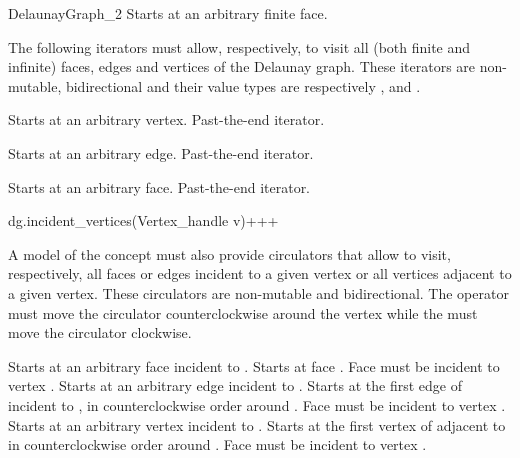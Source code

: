 \begin{ccRefConcept}{DelaunayGraph_2}
{Starts at an arbitrary finite face.}
\ccGlue
{}

The following iterators must allow, respectively, to visit all
(both finite and infinite) faces, edges and vertices
of the Delaunay graph. These iterators are non-mutable, bidirectional
and their value types are respectively
,  and . 

{Starts at an arbitrary  vertex.}
\ccGlue
{}
{Past-the-end iterator.}

{Starts at an arbitrary edge.}
\ccGlue
{}
{Past-the-end iterator.}

{Starts at an arbitrary face.}
\ccGlue
{}
{Past-the-end iterator.}


{dg.incident_vertices(Vertex_handle v)+++}{}
\ccThreeToTwo



A model of the  concept must also provide
circulators that allow to visit, respectively, all faces or edges
incident to a given vertex or all vertices adjacent to a given
vertex. These circulators are non-mutable and bidirectional. The
operator  must move the circulator counterclockwise
around the vertex while the  must move the circulator
clockwise.

{Starts at an arbitrary face incident to .}
\ccGlue
{}
{Starts at face .
\ccPrecond Face  must be incident to vertex .}
{}
{Starts at an arbitrary edge incident to .}
\ccGlue
{}
{Starts at the first edge of  incident to , in
  counterclockwise order around .
\ccPrecond Face  must be incident to vertex .}
{}
{Starts at an arbitrary  vertex incident to .}
\ccGlue
{}
{Starts at the first vertex of  adjacent  to  in
  counterclockwise order around .
\ccPrecond Face  must be incident to vertex .}




\end{ccRefConcept}
